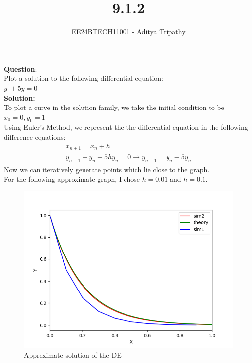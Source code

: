 \documentclass[journal]{IEEEtran}
\begin{document}

\vspace{3cm}

\title{9.1.2}
\author{EE24BTECH11001 - Aditya Tripathy
}
 \maketitle
{\let\newpage\relax\maketitle}

\renewcommand{\thefigure}{\theenumi}
\renewcommand{\thetable}{\theenumi}
\setlength{\intextsep}{10pt} %


\renewcommand{\thetable}{\theenumi}


\textbf{Question}:\\
Plot a solution to the following differential equation:\\
    $y^\prime + 5y = 0$
\\
\textbf{Solution: }\\
To plot a curve in the solution family, we take the initial condition to be\\
$x_0 = 0, y_0 = 1$\\
Using Euler's Method, we represent the the differential equation in the following difference equations:
\begin{align}
x_{n+1} = x_n + h\\
    y_{n+1} - y_n + 5hy_n  = 0 \xrightarrow{} y_{n+1} = y_n - 5y_n
\end{align}
Now we can iteratively generate points which lie close to the graph.\\
For the following approximate graph, I chose $h = 0.01$ and $h = 0.1$.
\begin{figure}[h!]
   \centering
   \includegraphics[width=0.7\linewidth]{figs/fig.png}
    \caption{Approximate solution of the DE}
\end{figure}
\end{document}

